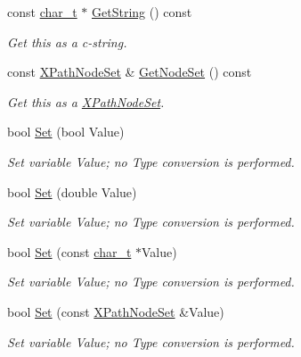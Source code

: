 \begin{DoxyCompactItemize}
const \hyperlink{namespacephys_1_1xml_afc87705cd1c2917d87b879715a2d8f6e}{char\_\-t} $\ast$ \hyperlink{classphys_1_1xml_1_1XPathVariable_a5354bcb8e5c2ffa6ececcf259049338b}{GetString} () const 
\begin{DoxyCompactList}\small\item\em Get this as a c-\/string. \item\end{DoxyCompactList}\item 
const \hyperlink{classphys_1_1xml_1_1XPathNodeSet}{XPathNodeSet} \& \hyperlink{classphys_1_1xml_1_1XPathVariable_a773036e3c3c3db0af26fa662782f7e56}{GetNodeSet} () const 
\begin{DoxyCompactList}\small\item\em Get this as a \hyperlink{classphys_1_1xml_1_1XPathNodeSet}{XPathNodeSet}. \item\end{DoxyCompactList}\item 
bool \hyperlink{classphys_1_1xml_1_1XPathVariable_aea78a6ac9a12a1be68db8a56fbffebc3}{Set} (bool Value)
\begin{DoxyCompactList}\small\item\em Set variable Value; no Type conversion is performed. \item\end{DoxyCompactList}\item 
bool \hyperlink{classphys_1_1xml_1_1XPathVariable_abb5f6da9b731d770e1a34ee9981b22be}{Set} (double Value)
\begin{DoxyCompactList}\small\item\em Set variable Value; no Type conversion is performed. \item\end{DoxyCompactList}\item 
bool \hyperlink{classphys_1_1xml_1_1XPathVariable_acf825ac8cd7dd20fc6f1c9fd7bb997fe}{Set} (const \hyperlink{namespacephys_1_1xml_afc87705cd1c2917d87b879715a2d8f6e}{char\_\-t} $\ast$Value)
\begin{DoxyCompactList}\small\item\em Set variable Value; no Type conversion is performed. \item\end{DoxyCompactList}\item 
bool \hyperlink{classphys_1_1xml_1_1XPathVariable_a121079abb73e70ade34f4e69181e5694}{Set} (const \hyperlink{classphys_1_1xml_1_1XPathNodeSet}{XPathNodeSet} \&Value)
\begin{DoxyCompactList}\small\item\em Set variable Value; no Type conversion is performed. \item\end{DoxyCompactList}\end{DoxyCompactItemize}
